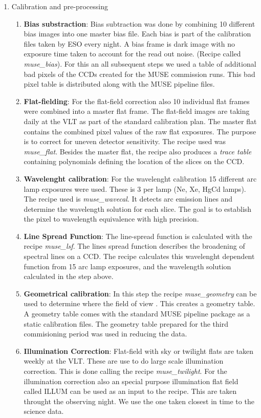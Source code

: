 \begin{enumerate}
        \item Calibration and pre-processing
                \begin{enumerate}[I]
			\item \textbf{Bias substraction}: Bias subtraction was done by combining 10 different bias images into one master bias file. Each bias is part of the calibration files taken by ESO every night. A bias frame is dark image with no exposure time taken to account for the read out noise. (Recipe called \emph{muse_bias}). For this an all subsequent steps we used a table of additional bad pixels of the CCDs created for the MUSE commission runs. This bad pixel table is distributed along with the MUSE pipeline files. 
			\item \textbf{Flat-fielding}: For the flat-field correction also 10 individual flat frames were combined into a master flat frame. The flat-field images are taking daily at the VLT as part of the standard calibration plan.  The master flat  contains  the  combined  pixel  values  of  the  raw  flat exposures. The purpose is to correct for uneven detector sensitivity. The recipe used was \emph{muse_flat}. Besides the master flat, the recipe also produces a \emph{trace table} containing polynomials defining the location of the slices on the CCD. 
			\item \textbf{Wavelenght calibration}: For the wavelenght calibration 15 different arc lamp exposures were used. These is 3 per lamp (Ne, Xe, HgCd lamps). The recipe used is \emph{muse_wavecal}. It detects arc emission lines and determine the wavelength solution for each slice. The goal is to establish the pixel to wavelength equivalence with high precision.
			\item \textbf{Line Spread Function}: The line-spread function is calculated with the recipe \emph{muse_lsf}. The lines spread function describes the broadening of spectral lines on a CCD. The recipe calculates this  wavelenght dependent function from 15 arc lamp exposures, and the wavelength solution calculated in the step above.  
			\item \textbf{Geometrical calibration}: In this step the recipe \emph{muse_geometry} can be used to determine where the field of view . This creates a geometry table. A geometry table comes with the standard MUSE pipeline package as a static calibration files. The geometry table prepared for the third commisioning period was used in reducing the data. 
			\item \textbf{Illumination Correction}: Flat-field with sky or twilight flats are taken weekly at the VLT. These are use to do large scale illumination correction. This is done calling the recipe \emph{muse_twilight}. For the illumination correction also an special purpose  illumination flat field called ILLUM can be used as an input to the recipe. This are taken throught the observing night. We use the one taken closest in time to the science data.  

\end{enumerate}
\end{enumerate}
